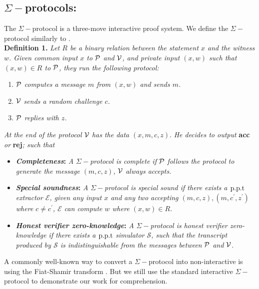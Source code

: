 \subsection{$\Sigma-$protocols:}\label{sec:sigma} The $\Sigma-$protocol is a three-move interactive proof system. We define the $\Sigma-$protocol similarly to \cite{damgard10}. \\
\textbf{Definition 1.} \textit{Let $R$ be a binary relation between the statement $x$ and the witness $w$. Given common input $x$ to }$\mathcal{P}$\textit{ and }$\mathcal{V}$\textit{, and private input $(x,w)$ such that $(x,w)\in{R}$ to }$\mathcal{P}$\textit{, they run the following protocol:}
\begin{enumerate}
    \item $\mathcal{P}$ \textit{computes a message $m$ from $(x,w)$ and sends $m$.}
    \item $\mathcal{V}$ \textit{sends a random challenge $c$.}
    \item $\mathcal{P}$ \textit{replies with $z$.}
\end{enumerate}
\textit{At the end of the protocol }$\mathcal{V}$ \textit{has the data $(x,m,c,z)$}. \textit{He decides to output }\textbf{acc}\textit{ or }\textbf{rej}\textit{; such that}
\begin{itemize}
    \item \textbf{\textit{Completeness}:} \textit{A $\Sigma-$protocol is complete if} $\mathcal{P}$ \textit{follows the protocol to generate the message $(m,c,z)$,} $\mathcal{V}$ \textit{always accepts.}
    \item \textbf{\textit{Special soundness}:} \textit{A $\Sigma-$protocol is special sound if there exists a $\text{p.p.t}$ extractor $\mathcal{E}$, given any input $x$ and any two accepting $(m,c,z),(m,c^\prime,z^\prime)$ where $c\ne{c^\prime}$, $\mathcal{E}$ can compute $w$ where $(x,w)\in{R}$.}
    \item \textbf{\textit{Honest verifier zero-knowledge}:} \textit{A $\Sigma-$protocol is honest verifier zero-knowledge if there exists a $\text{p.p.t}$ simulator $\mathcal{S}$, such that the transcript produced by $\mathcal{S}$ is indistinguishable from the messages between }$\mathcal{P}$\textit{ and }$\mathcal{V}$\textit{.}
\end{itemize}
A commonly well-known way to convert a $\Sigma-$protocol into non-interactive is using the Fiat-Shamir transform \cite{fs}. But we still use the standard interactive $\Sigma-$protocol to demonstrate our work for comprehension.

